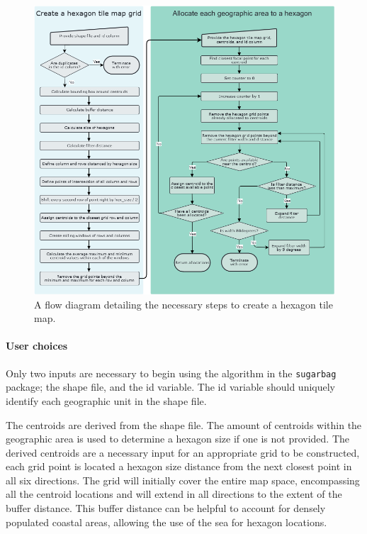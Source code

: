\begin{figure}
\includegraphics[width=14cm]{figs/sugarbag flow.png}
\caption{\label{fig:sugarbag_flow}A flow diagram detailing the necessary steps to create a hexagon tile map.}
\end{figure}

\hypertarget{user-choices}{%
\paragraph{User choices}\label{user-choices}}

Only two inputs are necessary to begin using the algorithm in the
\texttt{sugarbag} package; the shape file, and the id variable. The id
variable should uniquely identify each geographic unit in the shape
file.

The centroids are derived from the shape file. The amount of centroids
within the geographic area is used to determine a hexagon size if one is
not provided. The derived centroids are a necessary input for an
appropriate grid to be constructed, each grid point is located a hexagon
size distance from the next closest point in all six directions. The
grid will initially cover the entire map space, encompassing all the
centroid locations and will extend in all directions to the extent of
the buffer distance. This buffer distance can be helpful to account for
densely populated coastal areas, allowing the use of the sea for hexagon
locations.

